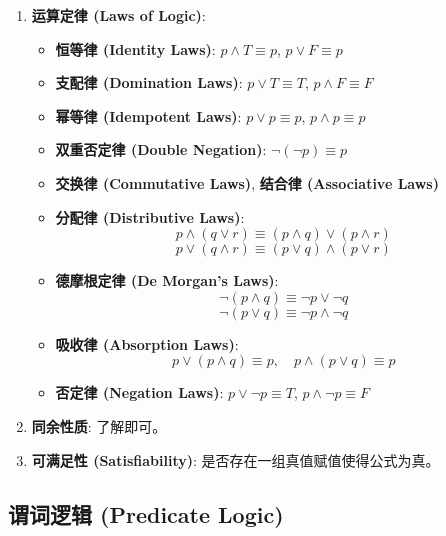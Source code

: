 \documentclass[a4paper,12pt]{ctexart}
\begin{document}
\begin{enumerate}
\newpage

    \item \textbf{运算定律 (Laws of Logic)}:
    \begin{itemize}
        \item \textbf{恒等律 (Identity Laws)}: $p \land T \equiv p$, $p \lor F \equiv p$
        \item \textbf{支配律 (Domination Laws)}: $p \lor T \equiv T$, $p \land F \equiv F$
        \item \textbf{幂等律 (Idempotent Laws)}: $p \lor p \equiv p$, $p \land p \equiv p$
        \item \textbf{双重否定律 (Double Negation)}: $\neg(\neg p) \equiv p$
        \item \textbf{交换律 (Commutative Laws)}, \textbf{结合律 (Associative Laws)}
        \item \textbf{分配律 (Distributive Laws)}: 
        $$p \land (q \lor r) \equiv (p \land q) \lor (p \land r)$$
        $$p \lor (q \land r) \equiv (p \lor q) \land (p \lor r)$$
        \item \textbf{德摩根定律 (De Morgan's Laws)}: 
        $$\neg (p \land q) \equiv \neg p \lor \neg q$$
        $$\neg (p \lor q) \equiv \neg p \land \neg q$$
        \item \textbf{吸收律 (Absorption Laws)}: 
        $$p \lor (p \land q) \equiv p, \quad p \land (p \lor q) \equiv p$$
        \item \textbf{否定律 (Negation Laws)}: $p \lor \neg p \equiv T$, $p \land \neg p \equiv F$
    \end{itemize}

    \item \textbf{同余性质}: 了解即可。
    \item \textbf{可满足性 (Satisfiability)}: 是否存在一组真值赋值使得公式为真。
\end{enumerate}

\subsection{谓词逻辑 (Predicate Logic)}
\end{document}
